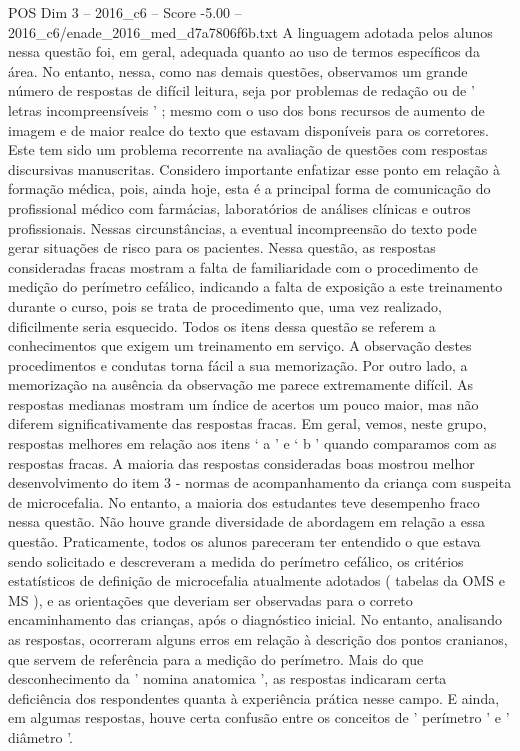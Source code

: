 \begin{textsample}{POS Dim 3 – 2016\_c6 – Score -5.00 – 2016\_c6/enade\_2016\_med\_d7a7806f6b.txt}
A linguagem adotada pelos alunos nessa questão foi, em geral, adequada quanto ao uso de termos específicos da área.
No entanto, nessa, como nas demais questões, observamos um grande número de respostas de difícil leitura, seja por problemas de redação ou de ' letras incompreensíveis ' ; mesmo com o uso dos bons recursos de aumento de imagem e de maior realce do texto que estavam disponíveis para os corretores.
Este tem sido um problema recorrente na avaliação de questões com respostas discursivas manuscritas.
Considero importante enfatizar esse ponto em relação à formação médica, pois, ainda hoje, esta é a principal forma de comunicação do profissional médico com farmácias, laboratórios de análises clínicas e outros profissionais.
Nessas circunstâncias, a eventual incompreensão do texto pode gerar situações de risco para os pacientes.
Nessa questão, as respostas consideradas fracas mostram a falta de familiaridade com o procedimento de medição do perímetro cefálico, indicando a falta de exposição a este treinamento durante o curso, pois se trata de procedimento que, uma vez realizado, dificilmente seria esquecido.
Todos os itens dessa questão se referem a conhecimentos que exigem um treinamento em serviço.
A observação destes procedimentos e condutas torna fácil a sua memorização.
Por outro lado, a memorização na ausência da observação me parece extremamente difícil.
As respostas medianas mostram um índice de acertos um pouco maior, mas não diferem significativamente das respostas fracas.
Em geral, vemos, neste grupo, respostas melhores em relação aos itens ‘ a ’ e ‘ b ’ quando comparamos com as respostas fracas.
A maioria das respostas consideradas boas mostrou melhor desenvolvimento do item 3 - normas de acompanhamento da criança com suspeita de microcefalia.
No entanto, a maioria dos estudantes teve desempenho fraco nessa questão.
Não houve grande diversidade de abordagem em relação a essa questão.
Praticamente, todos os alunos pareceram ter entendido o que estava sendo solicitado e descreveram a medida do perímetro cefálico, os critérios estatísticos de definição de microcefalia atualmente adotados ( tabelas da OMS e MS ), e as orientações que deveriam ser observadas para o correto encaminhamento das crianças, após o diagnóstico inicial.
No entanto, analisando as respostas, ocorreram alguns erros em relação à descrição dos pontos cranianos, que servem de referência para a medição do perímetro.
Mais do que desconhecimento da ' nomina anatomica ', as respostas indicaram certa deficiência dos respondentes quanta à experiência prática nesse campo.
E ainda, em algumas respostas, houve certa confusão entre os conceitos de ' perímetro ' e ' diâmetro '.

\end{textsample}

